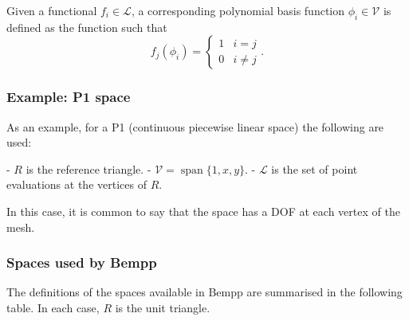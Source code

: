 \documentclass[a4paper]{book}
\begin{document}
Given a functional $f_i\in\mathcal{L}$, a corresponding polynomial basis function
$\phi_i\in\mathcal{V}$ is defined as the function such that
\[f_j(\phi_i)=\begin{cases}1&i=j\\0&i\not=j\end{cases}.\]

\subsubsection{ Example: P1 space}As an example, for a P1 (continuous piecewise linear space) the following are used:

- $R$ is the reference triangle.
- $\mathcal{V}=\operatorname{span}\{1, x, y\}$.
- $\mathcal{L}$ is the set of point evaluations at the vertices of $R$.

In this case, it is common to say that the space has a DOF at each vertex of the mesh.

\subsubsection{ Spaces used by Bempp}The definitions of the spaces available in Bempp are summarised in the following table.
In each case, $R$ is the unit triangle.
\end{document}
